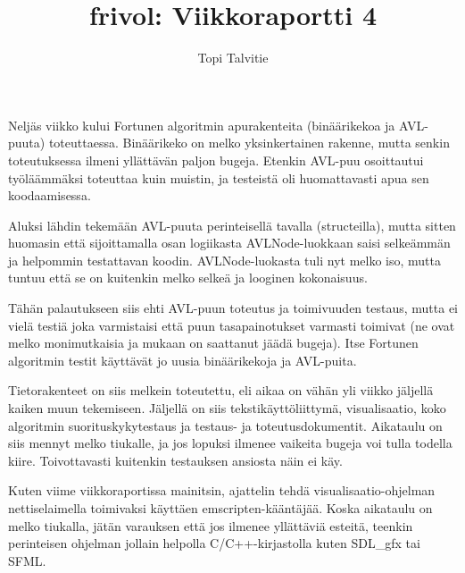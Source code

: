 \documentclass[a4paper, 11pt, finnish]{article}
\author{Topi Talvitie}
\title{frivol: Viikkoraportti 4}
\begin{document}
\maketitle

Neljäs viikko kului Fortunen algoritmin apurakenteita (binäärikekoa ja AVL-puuta) toteuttaessa.  Binäärikeko on melko yksinkertainen rakenne, mutta senkin toteutuksessa ilmeni yllättävän paljon bugeja. Etenkin AVL-puu osoittautui työläämmäksi toteuttaa kuin muistin, ja testeistä oli huomattavasti apua sen koodaamisessa.

Aluksi lähdin tekemään AVL-puuta perinteisellä tavalla (structeilla), mutta sitten huomasin että sijoittamalla osan logiikasta AVLNode-luokkaan saisi selkeämmän ja helpommin testattavan koodin. AVLNode-luokasta tuli nyt melko iso, mutta tuntuu että se on kuitenkin melko selkeä ja looginen kokonaisuus.

Tähän palautukseen siis ehti AVL-puun toteutus ja toimivuuden testaus, mutta ei vielä testiä joka varmistaisi että puun tasapainotukset varmasti toimivat (ne ovat melko monimutkaisia ja mukaan on saattanut jäädä bugeja). Itse Fortunen algoritmin testit käyttävät jo uusia binäärikekoja ja AVL-puita.

Tietorakenteet on siis melkein toteutettu, eli aikaa on vähän yli viikko jäljellä kaiken muun tekemiseen. Jäljellä on siis tekstikäyttöliittymä, visualisaatio, koko algoritmin suorituskykytestaus ja testaus- ja toteutusdokumentit. Aikataulu on siis mennyt melko tiukalle, ja jos lopuksi ilmenee vaikeita bugeja voi tulla todella kiire. Toivottavasti kuitenkin testauksen ansiosta näin ei käy.

Kuten viime viikkoraportissa mainitsin, ajattelin tehdä visualisaatio-ohjelman nettiselaimella toimivaksi käyttäen emscripten-kääntäjää. Koska aikataulu on melko tiukalla, jätän varauksen että jos ilmenee yllättäviä esteitä, teenkin perinteisen ohjelman jollain helpolla C/C++-kirjastolla kuten SDL\_gfx tai SFML.
\end{document}

